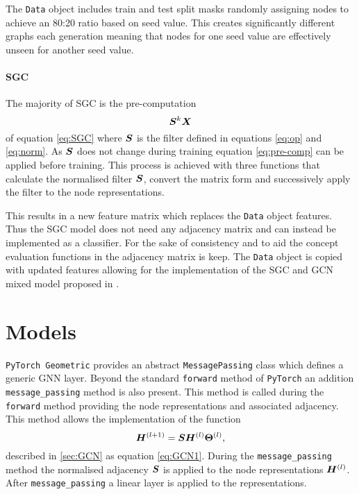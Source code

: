 The \texttt{Data} object includes train and test split masks randomly assigning nodes to achieve an 80:20 ratio based on seed value.
This 
creates significantly different graphs each generation
meaning that nodes for one seed value are effectively unseen for another seed value.

\paragraph{SGC}
The majority of SGC is the pre-computation
\begin{equation}
    \label{eq:pre-comp}
    {\bm{S}}^k{\bm{X}}
\end{equation}
of equation \ref{eq:SGC} where ${\bm{S}}$ is the filter defined in equations \ref{eq:op} and \ref{eq:norm}.
As ${\bm{S}}$ 
does not change during training equation \ref{eq:pre-comp} can be applied before training.
This process is achieved with three functions that calculate the normalised filter ${\bm{S}}$,
convert the matrix form and successively apply the filter to the node representations.

This results in a new feature matrix which replaces the \texttt{Data} object features.
Thus the SGC model does not need any adjacency matrix and can instead be implemented as a classifier.
For the sake of consistency and to aid the concept evaluation functions in  the adjacency matrix is keep.
The \texttt{Data} object is copied with updated features allowing for the implementation of the SGC and GCN mixed model proposed in .

\section{Models}
\label{sec:models}

\texttt{PyTorch Geometric} provides an abstract \texttt{MessagePassing} class which defines a generic GNN layer.
Beyond the standard \texttt{forward} method of \texttt{PyTorch}\cite{paszke2019pytorch} an addition \texttt{message\_passing} method is also present.
This method is called during the \texttt{forward} method providing the node representations and associated adjacency.
This method allows the implementation of the function
\begin{equation}
    {\bm{H}}^{(l+1)} = {\bm{S}}{\bm{H}}^{(l)}\bm{\Theta}^{(l)},
\end{equation}
described in \ref{sec:GCN} as equation \ref{eq:GCN1}.
During the \texttt{message\_passing} method the normalised adjacency ${\bm{S}}$ is applied to the node representations ${\bm{H}}^{(l)}$.
After \texttt{message\_passing} a linear layer is applied to the representations.

